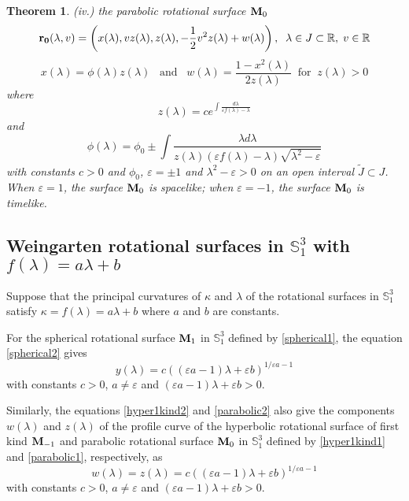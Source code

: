 \documentclass{amsart}
\newtheorem{Theorem}{Theorem}[section]
\theoremstyle{definition}
\numberwithin{equation}{section}
\begin{document}
\begin{Theorem}
\item {(iv.)} the parabolic rotational surface ${\bf M}_0$
\begin{equation}
\label{parabolic1}
    {\bf{r}_0}(\lambda,v)=\left(x(\lambda),vz(\lambda),z(\lambda),-\frac{1}{2}v^2z(\lambda)+w(\lambda)\right),\;\;\lambda\in J\subset\mathbb{R},\;v\in\mathbb{R}
\end{equation}
\begin{equation}
\label{parabolic3}
x(\lambda)=\phi(\lambda)z(\lambda)\;\;\;\mbox{and}\;\;\;
w(\lambda)=\frac{1-x^2(\lambda)}{2z(\lambda)}\;\;
\mbox{for}\;\;z(\lambda)>0
\end{equation}
where 
\begin{equation}
\label{parabolic2}
z(\lambda)=ce^{\int{\frac{d\lambda}{\varepsilon f(\lambda)-\lambda}}}
\end{equation}
and
\begin{equation}
\label{parabolic4}
\phi(\lambda)=\phi_0\pm\int\frac{\lambda d\lambda}{z(\lambda)
(\varepsilon f(\lambda)-\lambda)\sqrt{\lambda^2-\varepsilon}}
\end{equation}
with constants $c>0$ and $\phi_0$, $\varepsilon=\pm 1$
and $\lambda^2-\varepsilon>0$ on an open interval $\tilde{J}\subset J$. 
When $\varepsilon=1$, the surface ${\bf M}_0$ is spacelike; when $\varepsilon=-1$, the surface ${\bf M}_0$ is timelike.
\end{Theorem}




\subsection{Weingarten rotational surfaces in $\mathbb{S}^3_1$ with $f(\lambda)=a\lambda+b$}
Suppose that the principal curvatures of $\kappa$ and $\lambda$ of the rotational surfaces in $\mathbb{S}^3_1$ satisfy $\kappa=f(\lambda)=a\lambda+b$ where $a$ and $b$ are constants. 

For the spherical rotational surface ${\bf M}_1$ in 
$\mathbb{S}^3_1$ defined by \eqref{spherical1}, 
the equation \eqref{spherical2} gives
\begin{equation}
    \label{spherical6}
    y(\lambda)=c((\varepsilon a-1)\lambda+\varepsilon b)^{1/{\varepsilon a-1}}
\end{equation}
with constants $c>0$, $a\neq\varepsilon$ and 
$(\varepsilon a-1)\lambda+\varepsilon b>0$.

Similarly, the equations \eqref{hyper1kind2} and \eqref{parabolic2}
also give the components $w(\lambda)$ and $z(\lambda)$ of the profile curve of 
the hyperbolic rotational surface of first kind ${\bf M}_{-1}$ 
and parabolic rotational surface 
${\bf M}_0$ in $\mathbb{S}^3_1$ defined by \eqref{hyper1kind1} and \eqref{parabolic1}, respectively, as
\begin{equation}
    \label{spherical6a}
    w(\lambda)=z(\lambda)=c((\varepsilon a-1)\lambda+\varepsilon b)^{1/{\varepsilon a-1}}
\end{equation}
with constants $c>0$, $a\neq\varepsilon$ and 
$(\varepsilon a-1)\lambda+\varepsilon b>0$. 
\end{document}
